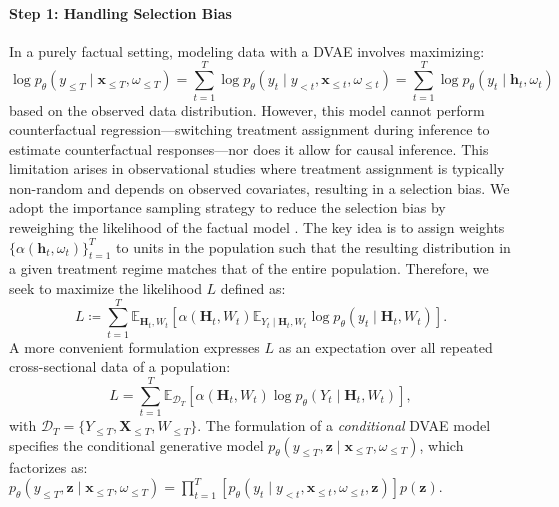 \documentclass[10pt]{article} %
\begin{document}
\paragraph{Step 1: Handling Selection Bias} In a purely factual setting, modeling data with a DVAE involves maximizing:
\vspace{-5pt} %
\[
\log p_{\theta}(y_{\leq T} \mid \mathbf{x}_{\leq T}, \omega_{\leq T}) = \sum_{t=1}^{T} \log p_{\theta}(y_{t} \mid y_{<t}, \mathbf{x}_{\leq t}, \omega_{\leq t}) = \sum_{t=1}^{T} \log p_{\theta}(y_{t} \mid \mathbf{h}_{t}, \omega_{t})
\]
based on the observed data distribution. However, this model cannot perform counterfactual regression—switching treatment assignment during inference to estimate counterfactual responses—nor does it allow for causal inference. This limitation arises in observational studies where treatment assignment is typically non-random and depends on observed covariates, resulting in a selection bias. We adopt the importance sampling strategy to reduce the selection bias by reweighing the likelihood of the factual model \citep{shimodaira2000WeightedLL}. The key idea is to assign weights $\{\alpha(\mathbf{h}_{t}, \omega_t)\}_{t=1}^{T}$ to units in the population such that the resulting distribution in a given treatment regime matches that of the entire population. Therefore, we seek to maximize the likelihood \(L\) defined as:
\[
L \coloneqq \sum_{t=1}^{T} \mathbb{E}_{\mathbf{H}_{t}, W_t}\left[\alpha(\mathbf{H}_t, W_t) \mathbb{E}_{Y_t \mid \mathbf{H}_{t}, W_t}\log p_{\theta}(y_{t} \mid \mathbf{H}_t, W_t)\right].
\]
A more convenient formulation expresses \(L\) as an expectation over all repeated cross-sectional data of a population:
\begin{equation}
    \label{eq:weighted_ll}
    L =  \sum_{t=1}^{T} \mathbb{E}_{\mathcal{D}_T}\left[\alpha(\mathbf{H}_t, W_t) \log p_{\theta}(Y_{t} \mid \mathbf{H}_t, W_t)\right],
\end{equation}
with \(\mathcal{D}_T = \{Y_{\leq T}, \mathbf{X}_{\leq T}, W_{\leq T} \}\). The formulation of a \emph{conditional} DVAE model specifies the conditional generative model \( p_{\theta}(y_{\leq T}, \mathbf{z} \mid \mathbf{x}_{\leq T}, \omega_{\leq T}) \), which factorizes as:
\( p_{\theta}(y_{\leq T}, \mathbf{z} \mid \mathbf{x}_{\leq T}, \omega_{\leq T}) = \prod_{t=1}^{T} \left[ p_{\theta}(y_{t} \mid y_{<t}, \mathbf{x}_{\leq t}, \omega_{\leq t}, \mathbf{z}) \right] p(\mathbf{z}).\)
\end{document}
